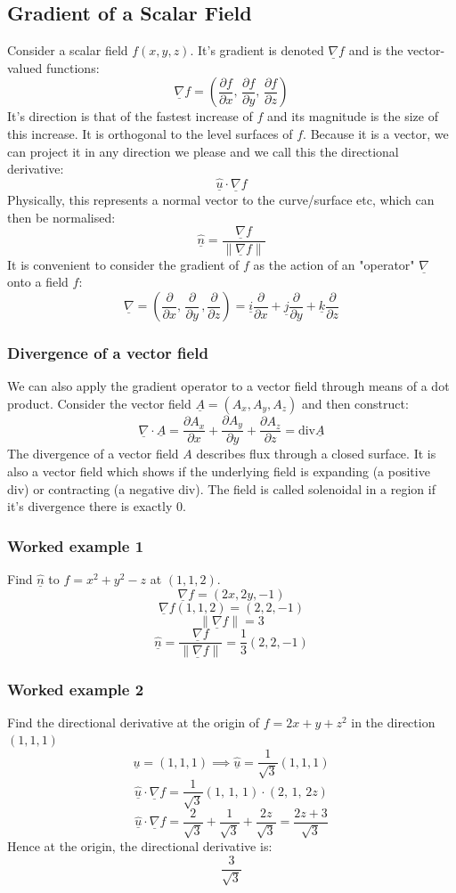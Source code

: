 \documentclass[12pt]{article}
\newcommand{\pf}[2]{\frac{\partial #1}{\partial #2}}
\newcommand{\dive}[1]{\underline{\nabla}\cdot\underline{#1}}
\newcommand{\grad}[1]{\underline{\nabla}#1}
\begin{document}
\subsection{Gradient of a Scalar Field}
Consider a scalar field \(f(x,y,z)\). It's gradient is denoted \(\underline{\nabla}f\) and is the vector-valued functions:
\[\grad{f}=\left(\pf{f}{x},\,\pf{f}{y},\,\pf{f}{z}\right)\]
It's direction is that of the fastest increase of \(f\) and its magnitude is the size of this increase. It is orthogonal to the level surfaces of \(f\). Because it is a vector, we can project it in any direction we please and we call this the directional derivative:
\[\underline{\hat{u}}\cdot\grad{f}\]
Physically, this represents a normal vector to the curve/surface etc, which can then be normalised:
\[\underline{\hat{n}}=\frac{\grad{f}}{\|\grad{f}\|}\]
It is convenient to consider the gradient of \(f\) as the action of an "operator" \(\grad{}\) onto a field \(f\):
\[\grad{}=\left(\pf{}{x},\,\pf{}{y}\,,\pf{}{z}\right)=\underline{i}\pf{}{x}+\underline{j}\pf{}{y}+\underline{k}\pf{}{z}\]
\subsubsection{Divergence of a vector field}
We can also apply the gradient operator to a vector field through means of a dot product. Consider the vector field \(\underline{A}=(A_x,A_y,A_z)\) and then construct:
\[\dive{A}=\pf{A_x}{x}+\pf{A_y}{y}+\pf{A_z}{z}=\text{div} \underline{A}\]
The divergence of a vector field \(A\) describes flux through a closed surface. It is also a vector field which shows if the underlying field is expanding (a positive div) or contracting (a negative div). The field is called solenoidal in a region if it's divergence there is exactly 0.
\subsubsection*{Worked example 1}
Find \(\underline{\hat{n}}\) to \(f=x^2+y^2-z\) at \((1,1,2)\).
\[\grad{f}=(2x,2y,-1)\]
\[\grad{f}(1,1,2)=(2,2,-1)\]
\[\|\grad{f}\|=3\]
\[\underline{\hat{n}}=\frac{\grad{f}}{\|\grad{f}\|}=\frac{1}{3}(2,2,-1)\]
\subsubsection*{Worked example 2}
Find the directional derivative at the origin of \(f=2x+y+z^2\) in the direction \((1,1,1)\)
\[\underline{u}=(1,1,1)\implies \underline{\hat{u}}=\frac{1}{\sqrt{3}}(1,1,1)\]
\[\underline{\hat{u}}\cdot\grad{f}=\frac{1}{\sqrt{3}}(1,\,1,\,1)\cdot(2,\,1,\,2z)\]
\[\underline{\hat{u}}\cdot\grad{f}=\frac{2}{\sqrt{3}}+\frac{1}{\sqrt{3}}+\frac{2z}{\sqrt{3}}=\frac{2z+3}{\sqrt3}\]
Hence at the origin, the directional derivative is:
\[\frac{3}{\sqrt{3}}\]
\end{document}

